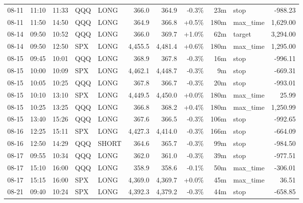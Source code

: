 \documentclass[11pt,a4paper,twoside]{article}
\begin{document}
\begin{center}
\begin{longtable}{>{\color{txtmain}}l l l l l r r r r >{\color{txtmain}}l r}
08-11 & 11:10 & 11:33 & QQQ & LONG & 366.0 & 364.9 & \textcolor{lossred}{-0.3\%} & 23m & stop & \textcolor{lossred}{-988.23} \\
08-11 & 11:50 & 14:50 & QQQ & LONG & 364.9 & 366.8 & \textcolor{wingreen}{+0.5\%} & 180m & max\_time & \textcolor{wingreen}{1,629.00} \\
08-14 & 09:50 & 10:52 & QQQ & LONG & 366.0 & 369.7 & \textcolor{wingreen}{+1.0\%} & 62m & target & \textcolor{wingreen}{3,294.00} \\
08-14 & 09:50 & 12:50 & SPX & LONG & 4,455.5 & 4,481.4 & \textcolor{wingreen}{+0.6\%} & 180m & max\_time & \textcolor{wingreen}{1,295.00} \\
08-15 & 09:45 & 10:01 & QQQ & LONG & 368.9 & 367.8 & \textcolor{lossred}{-0.3\%} & 16m & stop & \textcolor{lossred}{-996.11} \\
08-15 & 10:00 & 10:09 & SPX & LONG & 4,462.1 & 4,448.7 & \textcolor{lossred}{-0.3\%} & 9m & stop & \textcolor{lossred}{-669.31} \\
08-15 & 10:05 & 10:25 & QQQ & LONG & 367.8 & 366.7 & \textcolor{lossred}{-0.3\%} & 20m & stop & \textcolor{lossred}{-993.01} \\
08-15 & 10:10 & 13:10 & SPX & LONG & 4,449.5 & 4,450.0 & \textcolor{wingreen}{+0.0\%} & 180m & max\_time & \textcolor{wingreen}{25.99} \\
08-15 & 10:25 & 13:25 & QQQ & LONG & 366.8 & 368.2 & \textcolor{wingreen}{+0.4\%} & 180m & max\_time & \textcolor{wingreen}{1,250.99} \\
08-15 & 13:40 & 15:26 & QQQ & LONG & 367.6 & 366.5 & \textcolor{lossred}{-0.3\%} & 106m & stop & \textcolor{lossred}{-992.65} \\
08-16 & 12:25 & 15:11 & SPX & LONG & 4,427.3 & 4,414.0 & \textcolor{lossred}{-0.3\%} & 166m & stop & \textcolor{lossred}{-664.09} \\
08-16 & 12:50 & 14:29 & QQQ & SHORT & 364.6 & 365.7 & \textcolor{lossred}{-0.3\%} & 99m & stop & \textcolor{lossred}{-984.50} \\
08-17 & 09:55 & 10:34 & QQQ & LONG & 362.0 & 361.0 & \textcolor{lossred}{-0.3\%} & 39m & stop & \textcolor{lossred}{-977.51} \\
08-17 & 15:10 & 16:00 & QQQ & LONG & 358.9 & 358.6 & \textcolor{lossred}{-0.1\%} & 50m & max\_time & \textcolor{lossred}{-306.01} \\
08-17 & 15:15 & 16:00 & SPX & LONG & 4,369.0 & 4,369.7 & \textcolor{wingreen}{+0.0\%} & 45m & max\_time & \textcolor{wingreen}{36.51} \\
08-21 & 09:40 & 10:24 & SPX & LONG & 4,392.3 & 4,379.2 & \textcolor{lossred}{-0.3\%} & 44m & stop & \textcolor{lossred}{-658.85} \\

\end{longtable}
\end{center}
\end{document}
